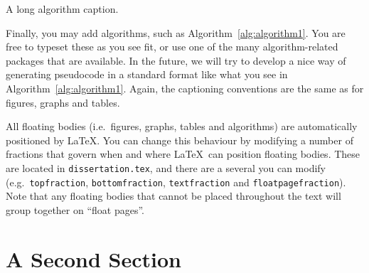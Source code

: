 \begin{algorithm}
	\caption[A short algorithm caption]{A long algorithm caption.}
	\label{alg:algorithm1}
\end{algorithm}
Finally, you may add algorithms, such as Algorithm~\ref{alg:algorithm1}. You are free to typeset these as you see fit, or use one of the many algorithm-related packages that are available. In the future, we will try to develop a nice way of generating pseudocode in a standard format like what you see in Algorithm~\ref{alg:algorithm1}. Again, the captioning conventions are the same as for figures, graphs and tables.

All floating bodies (i.e.\ figures, graphs, tables and algorithms) are automatically positioned by \LaTeX. You can change this behaviour by modifying a number of fractions that govern when and where \LaTeX\ can position floating bodies. These are located in \texttt{dissertation.tex}, and there are a several you can modify (e.g.\ \texttt{topfraction}, \texttt{bottomfraction}, \texttt{textfraction} and \texttt{floatpagefraction}). Note that any floating bodies that cannot be placed throughout the text will group together on ``float pages''.


\section{A Second Section}
\label{sec:first:second_sec}

